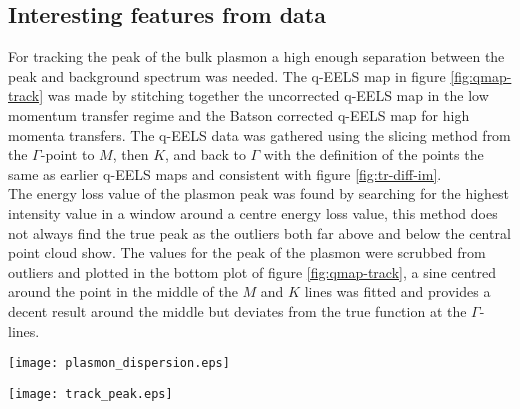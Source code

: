 \subsection{Interesting features from data}
%
For tracking the peak of the bulk plasmon a high enough separation between the peak and background spectrum was needed. The q-EELS map in figure \ref{fig:qmap-track} was made by stitching together the uncorrected q-EELS map in the low momentum transfer regime and the Batson corrected q-EELS map for high momenta transfers. The q-EELS data was gathered using the slicing method from the $\Gamma$-point to $M$, then $K$, and back to $\Gamma$ with the definition of the points the same as earlier q-EELS maps and consistent with figure \ref{fig:tr-diff-im}.\\
The energy loss value of the plasmon peak was found by searching for the highest intensity value in a window around a centre energy loss value, this method does not always find the true peak as the outliers both far above and below the central point cloud show. The values for the peak of the plasmon were scrubbed from outliers and plotted in the bottom plot of figure \ref{fig:qmap-track}, a sine centred around the point in the middle of the $M$ and $K$ lines was fitted and provides a decent result around the middle but deviates from the true function at the $\Gamma$-lines.\\

\begin{minipage}{0.48\linewidth}
	\centering
	\captionsetup{width=0.8\linewidth}
	\texttt{[image: plasmon\_dispersion.eps]}
	\label{fig:plas_disp}
\end{minipage}%
\begin{minipage}{0.48\linewidth}
	\centering
	\captionsetup{width=0.8\linewidth}
	\texttt{[image: track\_peak.eps]}
	\label{fig:track_peak}
\end{minipage}

